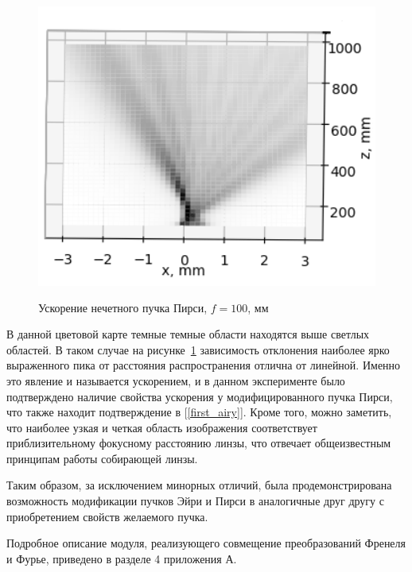 {    \begin{figure}[H]
        \centering
        \includegraphics[height = 10cm]{plots/pe_acc_before_focus.png}
        \caption{Ускорение нечетного пучка Пирси, $f = 100$, мм}
        \label{correct_acc_peodd}
    \end{figure}
    \vspace{0.4cm}
    В данной цветовой карте темные темные области находятся выше светлых областей.
    В таком случае на рисунке~\ref{correct_acc_peodd} зависимость отклонения наиболее ярко
    выраженного пика от расстояния распространения отлична от линейной.
    Именно это явление и называется ускорением, и в данном эксперименте было подтверждено наличие свойства ускорения
    у модифицированного пучка Пирси, что также находит подтверждение в [\ref{first_airy}].
    Кроме того, можно заметить, что наиболее узкая и четкая область изображения соответствует приблизительному
    фокусному расстоянию линзы, что отвечает общеизвестным принципам работы собирающей линзы.

    Таким образом, за исключением минорных отличий, была продемонстрирована возможность модификации пучков Эйри и
    Пирси в аналогичные друг другу с приобретением свойств желаемого пучка.

    Подробное описание модуля, реализующего совмещение преобразований Френеля и Фурье, приведено в разделе 4 приложения А.

    }
    \newpage

